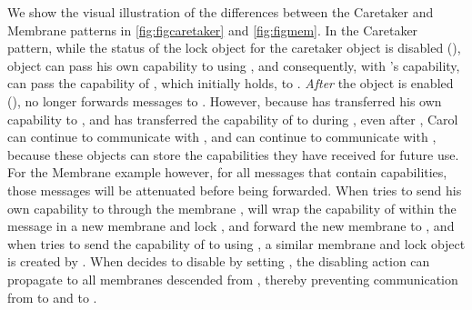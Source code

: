 \documentclass[a4paper,11pt,twoside]{article}
\begin{document}
{We show the visual illustration of the differences between the Caretaker and Membrane patterns in \cref{fig:figcaretaker} and \cref{fig:figmem}. In the Caretaker pattern, while the status of the lock object  for the caretaker object  is disabled (), object  can pass his own capability to  using , and consequently, with 's capability,  can pass the capability of , which  initially holds, to . \textit{After} the  object is enabled (),  no longer forwards messages to . However, because  has transferred his own capability to , and  has transferred the capability of  to  during , even after , Carol can continue to communicate with , and  can continue to communicate with , because these objects can store the capabilities they have received for future use. For the Membrane example however, for all messages that contain capabilities, those messages will be attenuated before being forwarded. When  tries to send his own capability to  through the membrane ,  will wrap the capability of  within the message in a new membrane  and lock , and forward the new membrane   to , and when  tries to send the capability of  to  using , a similar membrane  and lock object is created by . When  decides to disable  by setting , the disabling action can propagate to all membranes descended from , thereby preventing communication from  to  and  to .

\clearpage
\begin{minipage}{\textwidth}

\end{minipage}}
\end{document}
